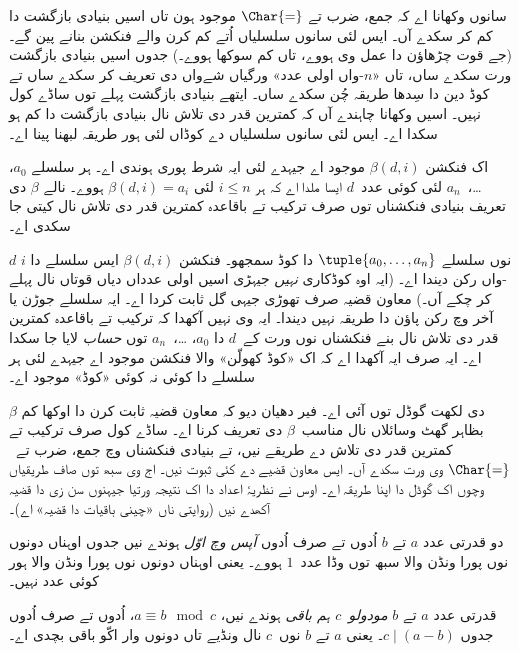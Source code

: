 \documentclass[../../../include/open-logic-section]{subfiles}
\begin{document}

سانوں وکھانا اے کہ جمع، ضرب تے $\Char{=}$ موجود ہون تاں
اسیں بنیادی بازگشت دا کم کر سکدے آں۔ ایس لئی سانوں سلسلیاں
اُتے کم کرن والے فنکشن بنانے پین گے۔ (جے قوت چڑھاؤن دا عمل وی
ہووے، تاں کم سوکھا ہووے۔) جدوں اسیں بنیادی بازگشت ورت سکدے ساں،
تاں «$n$-واں اولی عدد» ورگیاں شےواں دی تعریف کر سکدے ساں تے
کوڈ دین دا سِدھا طریقہ چُن سکدے ساں۔ ایتھے بنیادی بازگشت
پہلے توں ساڈے کول نہیں۔ اسیں وکھانا چاہندے آں کہ کمترین قدر
دی تلاش نال بنیادی بازگشت دا کم ہو سکدا اے۔
ایس لئی سانوں سلسلیاں دے کوڈاں لئی ہور طریقہ لبھنا پینا اے۔

\begin{lem}
اک فنکشن $\beta(d,i)$ موجود اے جیہدے لئی ایہ شرط پوری ہوندی
اے۔ ہر سلسلے $a_0$، \dots،~$a_n$ لئی کوئی عدد~$d$ ایسا ملدا اے
کہ ہر $i \le n$ لئی $\beta(d,i) = a_i$ ہووے۔ نالے $\beta$ دی
تعریف بنیادی فنکشناں توں صرف ترکیب تے باقاعدہ کمترین قدر دی
تلاش نال کیتی جا سکدی اے۔
\end{lem}

$d$ نوں سلسلے $\tuple{a_0, \dots, a_n}$ دا کوڈ سمجھو۔ فنکشن
$\beta(d,i)$ ایس سلسلے دا $i$-واں رکن دیندا اے۔ (ایہ اوہ کوڈکاری
\emph{نہیں} جیہڑی اسیں اولی عدداں دیاں قوتاں نال پہلے کر چکے آں۔)
معاون قضیہ صرف تھوڑی جیہی گل ثابت کردا اے۔ ایہ سلسلے جوڑن یا
آخر وچ رکن پاؤن دا طریقہ نہیں دیندا۔ ایہ وی نہیں آکھدا کہ ترکیب
تے باقاعدہ کمترین قدر دی تلاش نال بنے فنکشناں نوں ورت کے~$d$
دا $a_0$، \dots،~$a_n$ توں \emph{حساب} لایا جا سکدا اے۔ ایہ صرف
ایہ آکھدا اے کہ اک «کوڈ کھولّن» والا فنکشن موجود اے جیہدے لئی
ہر سلسلے دا کوئی نہ کوئی «کوڈ» موجود اے۔

$\beta$ دی لکھت گوڈل توں آئی اے۔ فیر دھیان دیو کہ معاون قضیہ
ثابت کرن دا اوکھا کم بظاہر گھٹ وسائلاں نال مناسب~$\beta$
دی تعریف کرنا اے۔ ساڈے کول
صرف ترکیب تے کمترین قدر دی تلاش دے طریقے نیں، تے بنیادی فنکشناں
وچ جمع، ضرب تے~$\Char{=}$ وی ورت سکدے آں۔ ایس معاون قضیے دے کئی
ثبوت نیں۔ اج وی سبھ توں صاف طریقیاں وچوں اک گوڈل دا اپنا طریقہ
اے۔ اوس نے نظریۂ اعداد دا اک نتیجہ ورتیا جیہنوں سن زی دا قضیہ
آکھدے نیں (روایتی ناں «چینی باقیات دا قضیہ» اے)۔

\begin{defn}
دو قدرتی عدد $a$ تے $b$ اُدوں تے صرف اُدوں \emph{آپس وچ اوّل}
ہوندے نیں جدوں اوہناں دونوں نوں پورا ونڈن والا سبھ توں وڈا
عدد~$1$ ہووے۔ یعنی اوہناں دونوں نوں پورا ونڈن والا ہور کوئی
عدد نہیں۔
\end{defn}

\begin{defn}
قدرتی عدد $a$ تے $b$ \emph{مودولو~$c$ ہم باقی} ہوندے نیں،
$a \equiv b \mod c$، اُدوں تے صرف اُدوں جدوں $c \mid (a-b)$۔
یعنی $a$ تے $b$ نوں~$c$ نال ونڈیے تاں دونوں وار اکّو باقی
بچدی اے۔
\end{defn}
\end{document}
